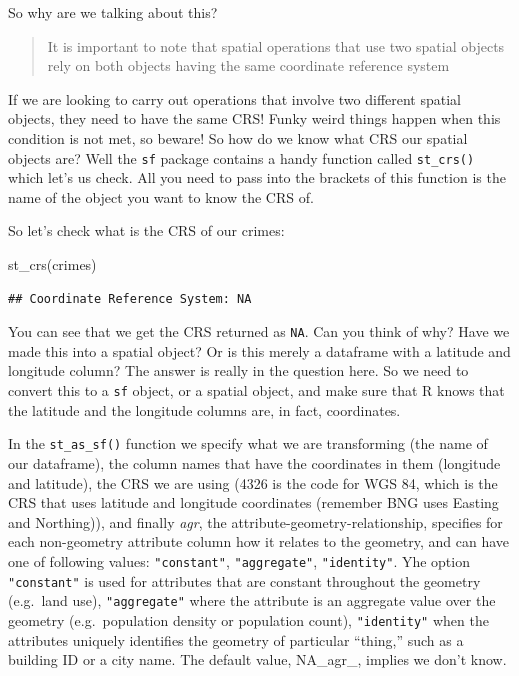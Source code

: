 \documentclass[
]{book}
\makeatletter
\newenvironment{Shaded}{\begin{snugshade}}{\end{snugshade}}
\newcommand{\FunctionTok}[1]{\textcolor[rgb]{0,0,0}{#1}}
\newcommand{\NormalTok}[1]{#1}
\newenvironment{kframe}{%
\medskip{}
\setlength{\fboxsep}{.8em}
 \def\at@end@of@kframe{}%
 \ifinner\ifhmode%
  \def\at@end@of@kframe{\end{minipage}}%
  \begin{minipage}{\columnwidth}%
 \fi\fi%
 \def\FrameCommand##1{\hskip\@totalleftmargin \hskip-\fboxsep
 \colorbox{shadecolor}{##1}\hskip-\fboxsep
     \hskip-\linewidth \hskip-\@totalleftmargin \hskip\columnwidth}%
 \MakeFramed {\advance\hsize-\width
   \@totalleftmargin\z@ \linewidth\hsize
   \@setminipage}}%
 {\par\unskip\endMakeFramed%
 \at@end@of@kframe}
\renewenvironment{Shaded}{\begin{kframe}}{\end{kframe}}
\makeatother
\begin{document}
So why are we talking about this?

\begin{quote}
It is important to note that spatial operations that use two spatial objects rely on both objects having the same coordinate reference system
\end{quote}

If we are looking to carry out operations that involve two different spatial objects, they need to have the same CRS! Funky weird things happen when this condition is not met, so beware! So how do we know what CRS our spatial objects are? Well the \texttt{sf} package contains a handy function called \texttt{st\_crs()} which let's us check. All you need to pass into the brackets of this function is the name of the object you want to know the CRS of.

So let's check what is the CRS of our crimes:

\begin{Shaded}
\begin{Highlighting}[]
\FunctionTok{st\_crs}\NormalTok{(crimes)}
\end{Highlighting}
\end{Shaded}

\begin{verbatim}
## Coordinate Reference System: NA
\end{verbatim}

You can see that we get the CRS returned as \texttt{NA}. Can you think of why? Have we made this into a spatial object? Or is this merely a dataframe with a latitude and longitude column? The answer is really in the question here. So we need to convert this to a \texttt{sf} object, or a spatial object, and make sure that R knows that the latitude and the longitude columns are, in fact, coordinates.

In the \texttt{st\_as\_sf()} function we specify what we are transforming (the name of our dataframe), the column names that have the coordinates in them (longitude and latitude), the CRS we are using (4326 is the code for WGS 84, which is the CRS that uses latitude and longitude coordinates (remember BNG uses Easting and Northing)), and finally \emph{agr}, the attribute-geometry-relationship, specifies for each non-geometry attribute column how it relates to the geometry, and can have one of following values: \texttt{"constant"}, \texttt{"aggregate"}, \texttt{"identity"}. Yhe option \texttt{"constant"} is used for attributes that are constant throughout the geometry (e.g.~land use), \texttt{"aggregate"} where the attribute is an aggregate value over the geometry (e.g.~population density or population count), \texttt{"identity"} when the attributes uniquely identifies the geometry of particular ``thing,'' such as a building ID or a city name. The default value, NA\_agr\_, implies we don't know.
\end{document}
